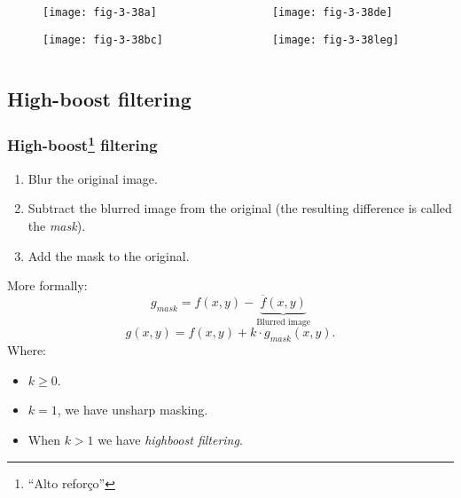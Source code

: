 \begin{frame}
\begin{columns}
\begin{column}{.5\textwidth}
\begin{figure}
\centering
\texttt{[image: fig-3-38a]}
\end{figure}
\begin{figure}
\centering
\texttt{[image: fig-3-38bc]}
\end{figure}
\end{column}
\begin{column}{.5\textwidth}
\begin{figure}
\centering
\texttt{[image: fig-3-38de]}
\end{figure}
\begin{figure}
\centering
\texttt{[image: fig-3-38leg]}
\end{figure}
\end{column}
\end{columns}
\end{frame}


\subsection{High-boost filtering}


\begin{frame}
\frametitle{High-boost\footnote{``Alto reforço''} filtering}
\begin{enumerate}
\item Blur the original image.
\item Subtract the blurred image from the original (the resulting difference is called the \textit{mask}).
\item Add the mask to the original.
\end{enumerate}
\end{frame}


\begin{frame}
More formally:
\[
g_{mask} = f(x,y) - \underbrace{\overline{f}(x,y)}_{\text{Blurred image}}
\]
\begin{equation}
g(x,y) = f(x,y) + k \cdot g_{mask} (x,y).
\end{equation}
Where:
\begin{itemize}
\item $k\geq 0$.
\item $k=1$, we have unsharp masking.
\item When $k>1$ we have \textit{highboost filtering}.
\end{itemize}
\end{frame}

